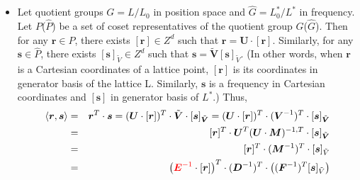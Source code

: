 \documentclass[10pt]{book}
\def\bm{\boldsymbol}
\newcommand{\bea}{\begin{eqnarray}}
\newcommand{\eea}{\end{eqnarray}}
\newcommand{\no}{\nonumber \\}
\def\vr{{\bm r}}
\def\la{\langle}
\def\ra{\rangle}
\begin{document}
\begin{itemize}
\item Let quotient groups $G=L/L_0$ in position space and $\hat{G}=L_0^*/L^*$ in frequency. 
Let $P$($\hat{P}$) be a set of coset representatives of the 
quotient group $G$($\hat{G}$). Then for any ${\bm r}\in P$, there exists $[{\bm r}]\in Z^d$ such that
${\bm r}={\bm U}\cdot[{\bm r}]$. Similarly, for any ${\bm s}\in \hat{P}$, there exists
$[{\bm s}]_{\tilde V}\in Z^d$ such that ${\bm s}=\tilde{\bm V}[{\bm s}]_{\tilde V}$.
(In other words, when $\vr$ is a Cartesian coordinates of a lattice point, 
$[\vr]$ is its coordinates in generator basis of the lattice L. Similarly, 
${\bm s}$ is a frequency in Cartesian coordinates and $[{\bm s}]$ in  generator basis of $L^*$.)
Thus, 
\bea 
\la {\bm r},{\bm s}\ra &=&{\bm r}^T\cdot{\bm s}
=({\bm U}\cdot[{\bm r}])^T\cdot\tilde{\bm V}\cdot[{\bm s}]_{\tilde{\bm V}}
=({\bm U}\cdot[{\bm r}])^T\cdot ({\bm V}^{-1})^T\cdot[{\bm s}]_{\tilde{\bm V}} \no 
&=&[{\bm r}]^T\cdot {\bm U}^T ({\bm U}\cdot{\bm M})^{-1,T}
\cdot[{\bm s}]_{\tilde{\bm V}} \no 
&=&[{\bm r}]^T\cdot({\bm M}^{-1})^T \cdot [{\bm s}]_{\tilde V} \no 
&=&\left({\color{red}{\bm E}^{-1}}\cdot[{\bm r}]\right)^T\cdot({\bm D}^{-1})^T 
\cdot \left(({\bm F}^{-1})^T [{\bm s}]_{\tilde V}\right) 
\eea     
   
\end{itemize} 
\end{document}
